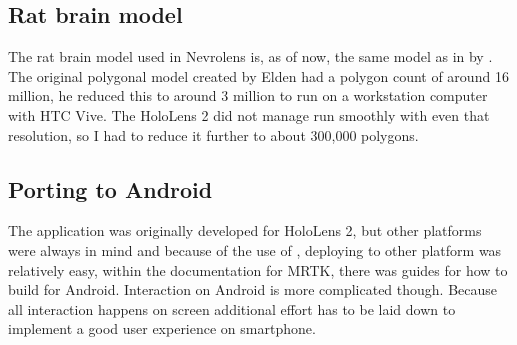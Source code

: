\subsection*{Rat brain model}
The rat brain model used in Nevrolens is, as of now, the same model as in  by \citet{Elden2017}. The original polygonal model created by Elden had a polygon count of around 16 million, he reduced this to around 3 million to run on a workstation computer with HTC Vive. The HoloLens 2 did not manage run smoothly with even that resolution, so I had to reduce it further to about 300,000 polygons.

\subsection*{Porting to Android}
The application was originally developed for HoloLens 2, but other platforms were always in mind and because of the use of , deploying to other platform was relatively easy, within the documentation for MRTK, there was guides for how to build for Android. Interaction on Android is more complicated though. Because all interaction happens on screen additional effort has to be laid down to implement a good user experience on smartphone.  




